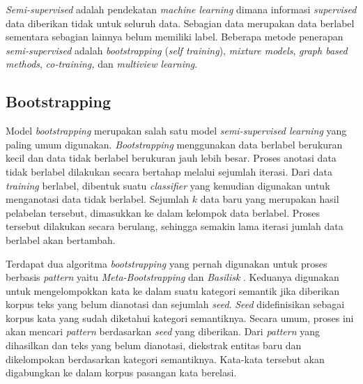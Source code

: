 \textit{Semi-supervised} adalah pendekatan \textit{machine learning} dimana informasi \textit{supervised} data diberikan tidak untuk seluruh data. Sebagian data merupakan data berlabel sementara sebagian lainnya belum memiliki label. Beberapa metode penerapan \textit{semi-supervised} adalah \textit{bootstrapping} (\textit{self training}), \textit{mixture models}, \textit{graph based methods}, \textit{co-training,} dan \textit{multiview learning}.

\subsection{Bootstrapping}
Model \textit{bootstrapping} merupakan salah satu model \textit{semi-supervised learning} yang paling umum digunakan. \textit{Bootstrapping} menggunakan data berlabel berukuran kecil dan data tidak berlabel berukuran jauh lebih besar. Proses anotasi data tidak berlabel dilakukan secara bertahap melalui sejumlah iterasi. Dari data \textit{training} berlabel, dibentuk suatu \textit{classifier} yang kemudian digunakan untuk menganotasi data tidak berlabel. Sejumlah $k$ data baru yang merupakan hasil pelabelan tersebut, dimasukkan ke dalam kelompok data berlabel. Proses tersebut dilakukan secara berulang, sehingga semakin lama iterasi jumlah data berlabel akan bertambah. 

Terdapat dua algoritma \textit{bootstrapping} yang pernah digunakan untuk proses berbasis \textit{pattern} yaitu \textit{Meta-Bootstrapping} dan \textit{Basilisk} \citep{riloff2003learning}. Keduanya digunakan untuk mengelompokkan kata ke dalam suatu kategori semantik jika diberikan korpus teks yang belum dianotasi dan sejumlah \textit{seed}. \textit{Seed} didefinisikan sebagai korpus kata yang sudah diketahui kategori semantiknya. Secara umum, proses ini akan mencari \textit{pattern} berdasarkan \textit{seed} yang diberikan. Dari \textit{pattern} yang dihasilkan dan teks yang belum dianotasi, diekstrak entitas baru dan dikelompokan berdasarkan kategori semantiknya. Kata-kata tersebut akan digabungkan ke dalam korpus pasangan kata berelasi.

